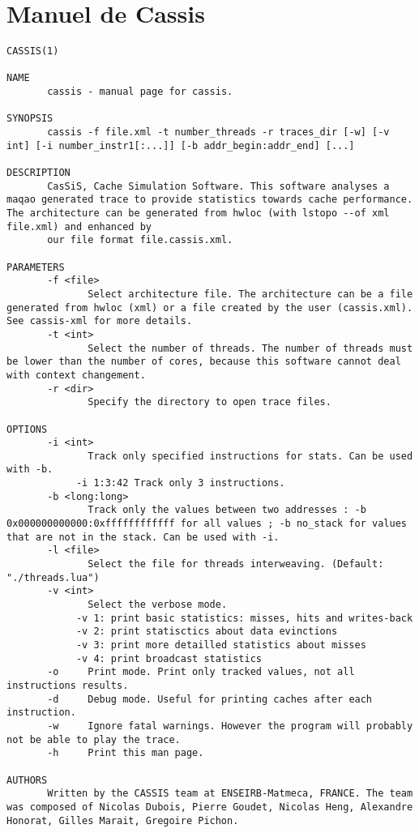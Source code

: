 \section{Manuel de Cassis}
\begin{lstlisting}[style=styleMan]
CASSIS(1)

NAME
       cassis - manual page for cassis.

SYNOPSIS
       cassis -f file.xml -t number_threads -r traces_dir [-w] [-v int] [-i number_instr1[:...]] [-b addr_begin:addr_end] [...]

DESCRIPTION
       CasSiS, Cache Simulation Software. This software analyses a maqao generated trace to provide statistics towards cache performance. The architecture can be generated from hwloc (with lstopo --of xml file.xml) and enhanced by
       our file format file.cassis.xml.

PARAMETERS
       -f <file>
              Select architecture file. The architecture can be a file generated from hwloc (xml) or a file created by the user (cassis.xml). See cassis-xml for more details.
       -t <int>
              Select the number of threads. The number of threads must be lower than the number of cores, because this software cannot deal with context changement.
       -r <dir>
              Specify the directory to open trace files.

OPTIONS
       -i <int>
              Track only specified instructions for stats. Can be used with -b.
            -i 1:3:42 Track only 3 instructions.
       -b <long:long>
              Track only the values between two addresses : -b 0x000000000000:0xffffffffffff for all values ; -b no_stack for values that are not in the stack. Can be used with -i.
       -l <file>
              Select the file for threads interweaving. (Default: "./threads.lua")
       -v <int>
              Select the verbose mode.
            -v 1: print basic statistics: misses, hits and writes-back
            -v 2: print statisctics about data evinctions
            -v 3: print more detailled statistics about misses
            -v 4: print broadcast statistics
       -o     Print mode. Print only tracked values, not all instructions results.
       -d     Debug mode. Useful for printing caches after each instruction.
       -w     Ignore fatal warnings. However the program will probably not be able to play the trace.
       -h     Print this man page.

AUTHORS
       Written by the CASSIS team at ENSEIRB-Matmeca, FRANCE. The team was composed of Nicolas Dubois, Pierre Goudet, Nicolas Heng, Alexandre Honorat, Gilles Marait, Gregoire Pichon.


\end{lstlisting}
